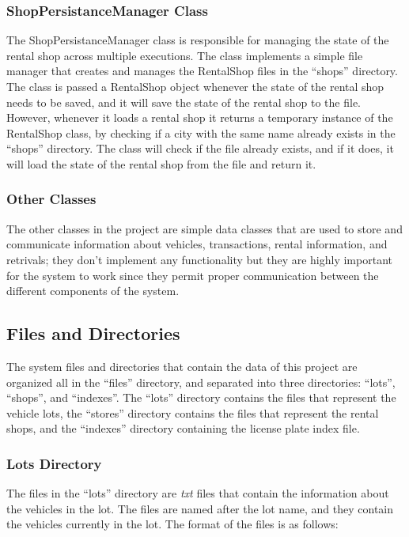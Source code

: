 \documentclass[conference]{IEEEtran}
\begin{document}
\subsubsection{ShopPersistanceManager Class}
The ShopPersistanceManager class is responsible for managing the state of the rental shop across multiple executions. The class implements a simple file manager that creates and manages the RentalShop files in the ``shops'' directory. The class is passed a RentalShop object whenever the state of the rental shop needs to be saved, and it will save the state of the rental shop to the file. However, whenever it loads a rental shop it returns a temporary instance of the RentalShop class, by checking if a city with the same name already exists in the ``shops'' directory. The class will check if the file already exists, and if it does, it will load the state of the rental shop from the file and return it. 

\subsubsection{Other Classes}
The other classes in the project are simple data classes that are used to store and communicate information about vehicles, transactions, rental information, and retrivals; they don't implement any functionality but they are highly important for the system to work since they permit proper communication between the different components of the system.

\subsection{Files and Directories}
The system files and directories that contain the data of this project are organized all in the ``files'' directory, and separated into three directories: ``lots'', ``shops'', and ``indexes''. The ``lots'' directory contains the files that represent the vehicle lots, the ``stores'' directory contains the files that represent the rental shops, and the ``indexes'' directory containing the license plate index file. 

\subsubsection{Lots Directory}
The files in the ``lots'' directory are \textit{txt} files that contain the information about the vehicles in the lot. The files are named after the lot name, and they contain the vehicles currently in the lot. The format of the files is as follows:
\end{document}
